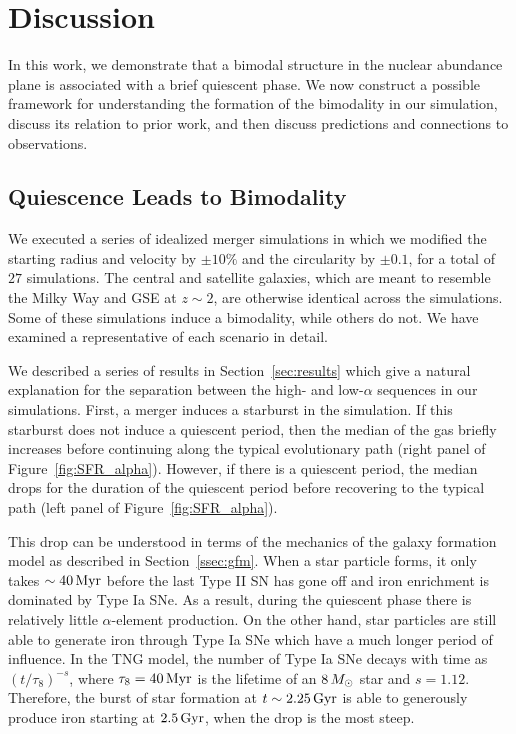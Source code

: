 \section{Discussion}\label{sec:discussion}
In this work, we demonstrate that a bimodal structure in the nuclear abundance plane is associated with a brief quiescent phase. We now construct a possible framework for understanding the formation of the bimodality in our simulation, discuss its relation to prior work, and then discuss predictions and connections to observations.

\subsection{Quiescence Leads to Bimodality}\label{ssec:formqui}
We executed a series of idealized merger simulations in which we modified the starting radius and velocity by $\pm10\%$ and the circularity by $\pm0.1$, for a total of $27$ simulations. The central and satellite galaxies, which are meant to resemble the Milky Way and GSE at $z\sim2$, are otherwise identical across the simulations. Some of these simulations induce a bimodality, while others do not. We have examined a representative of each scenario in detail.

We described a series of results in Section~\ref{sec:results} which give a natural explanation for the separation between the high- and low-$\alpha$ sequences in our simulations. First, a merger induces a starburst in the simulation. If this starburst does not induce a quiescent period, then the median \MgFe{} of the gas briefly increases before continuing along the typical evolutionary path (right panel of Figure~\ref{fig:SFR_alpha}). However, if there is a quiescent period, the median \MgFe{} drops for the duration of the quiescent period before recovering to the typical path (left panel of Figure~\ref{fig:SFR_alpha}).

This drop can be understood in terms of the mechanics of the galaxy formation model as described in Section~\ref{ssec:gfm}. When a star particle forms, it only takes $\sim40\,\textrm{Myr}$ before the last Type II SN has gone off and iron enrichment is dominated by Type Ia SNe. As a result, during the quiescent phase there is relatively little $\alpha$-element production. On the other hand, star particles are still able to generate iron through Type Ia SNe which have a much longer period of influence. In the TNG model, the number of Type Ia SNe decays with time as $(t/\tau_8)^{-s}$, where $\tau_8=40\,\textrm{Myr}$ is the lifetime of an $8\,M_{\odot}$ star and $s=1.12$. Therefore, the burst of star formation at $t\sim2.25\,\textrm{Gyr}$ is able to generously produce iron starting at $2.5\,\textrm{Gyr}$, when the drop is the most steep.

